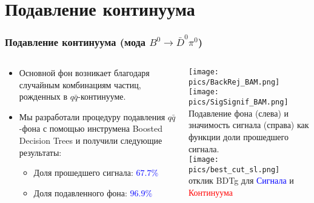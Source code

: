 \documentclass[10 pt,compress,mathserif]{beamer}
\newcommand{\bdpi}{\ensuremath{B^0\to \bar D^0\pi^0}\xspace}
\begin{document}
\section{Подавление континуума}
\begin{frame}
 \frametitle{Подавление континуума (мода \bdpi)}
 \begin{small}
 \begin{columns}
  \begin{column}{0.4\textwidth}
   \begin{itemize}
    \item Основной фон возникает благодаря случайным комбинациям частиц, рожденных в $q\bar q$-континууме.
    \item Мы разработали процедуру подавления $q\bar q$-фона с помощью инструмена Boosted Decision Trees и получили следующие результаты:
    \begin{itemize}
     \item Доля прошедшего сигнала: \textcolor{blue}{$67.7\%$}
     \item Доля подавленного фона: \textcolor{blue}{$96.9\%$}
    \end{itemize}
   \end{itemize}

  \end{column}
  \begin{column}{0.6\textwidth}
   \begin{center}
    \texttt{[image: pics/BackRej\_BAM.png]}
    \texttt{[image: pics/SigSignif\_BAM.png]}\\
    Подавление фона (слева) и значимость сигнала (справа) как функции доли прошедшего сигнала.\\
    \texttt{[image: pics/best\_cut\_sl.png]}\\
    отклик BDTg для \textcolor{blue}{Сигнала} и \textcolor{red}{Континуума}
   \end{center}
  \end{column}
 \end{columns}
 \end{small}
\end{frame}
\end{document}
